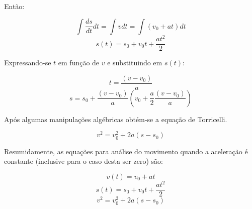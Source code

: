 \documentclass[
    12pt, %
    openright,
    twoside, %
    a4paper, %
    article,
    english,brazil %
]{abntex2}
\begin{document}
Então:

$$ \int \frac{ds}{dt} dt = \int v dt = \int (v_0 + at) dt $$
$$ s(t) = s_0 + v_0 t + \frac{a t^2}{2} $$

Expressando-se $t$ em função de $v$ e substituindo em $s(t)$:

$$t = \frac{(v - v_0)}{a}$$
$$s = s_0 + \frac{(v - v_0)}{a}(v_0 + \frac{a}{2}\frac{(v - v_0)}{a})$$

Após algumas manipulações algébricas obtém-se a equação de Torricelli. 

$$v^2 = v_0^2 + 2a(s-s_0)$$

Resumidamente, as equações para análise do movimento quando a aceleração é constante (inclusive para o caso desta ser zero) são:

\begin{equation}
v(t) = v_0 + at
\end{equation}
\begin{equation}
s(t) = s_0 + v_0t + \frac{at^2}{2}    
\end{equation}
\begin{equation}
v^2 = v_0^2 + 2a(s - s_0)
\end{equation}
\end{document}
